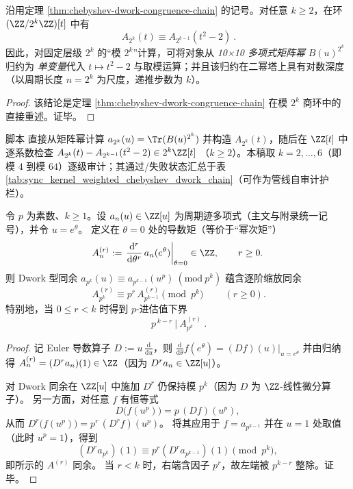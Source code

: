 \begin{corollary}\label{cor:chebyshev-dwork-matrixfree}
沿用定理 \ref{thm:chebyshev-dwork-congruence-chain} 的记号。对任意 \(k\ge 2\)，在环 \((\ZZ/2^k\ZZ)[t]\) 中有
\[
\boxed{\ A_{2^k}(t)\equiv A_{2^{k-1}}(t^2-2)\ }.
\]
因此，对固定层级 \(2^k\) 的“模 \(2^k\)”计算，可将对象从 \emph{10×10 多项式矩阵幂} \(B(u)^{2^k}\) 归约为 \emph{单变量}代入 \(t\mapsto t^2-2\) 与取模运算；并且该归约在二幂塔上具有对数深度（以周期长度 \(n=2^k\) 为尺度，递推步数为 \(k\)）。
\end{corollary}
\begin{proof}
该结论是定理 \ref{thm:chebyshev-dwork-congruence-chain} 在模 \(2^k\) 商环中的直接重述。证毕。
\end{proof}

\begin{remark}\label{rem:chebyshev-dwork-audit}
脚本  直接从矩阵幂计算
\(
a_{2^k}(u)=\Tr(B(u)^{2^k})
\)
并构造 \(A_{2^k}(t)\)，随后在 \(\ZZ[t]\) 中逐系数检查
\(
A_{2^k}(t)-A_{2^{k-1}}(t^2-2)\in 2^k\ZZ[t]
\)
（\(k\ge 2\)）。本稿取 \(k=2,\dots,6\)（即模 \(4\) 到模 \(64\)）逐级审计；其通过/失败状态汇总于表 \ref{tab:sync_kernel_weighted_chebyshev_dwork_chain}（可作为管线自审计护栏）。
\end{remark}


\begin{proposition}\label{prop:witt-theta-derivative-filter}
令 \(p\) 为素数、\(k\ge 1\)。设 \(a_n(u)\in\ZZ[u]\) 为周期迹多项式（主文与附录统一记号），并令 \(u=e^\theta\)。
定义在 \(\theta=0\) 处的导数矩（等价于“幂次矩”）
$$
A_{n}^{(r)}:=\left.\frac{\mathrm{d}^r}{\mathrm{d}\theta^r}\,a_n(e^\theta)\right|_{\theta=0}\in\ZZ,\qquad r\ge 0.
$$
则 Dwork 型同余 \(a_{p^k}(u)\equiv a_{p^{k-1}}(u^p)\ (\mathrm{mod}\ p^k)\) 蕴含逐阶缩放同余
$$
\boxed{\ A_{p^k}^{(r)}\equiv p^r\,A_{p^{k-1}}^{(r)}\pmod{p^k}\ }\qquad(r\ge 0).
$$
特别地，当 \(0\le r<k\) 时得到 \(p\)-进估值下界
$$
\boxed{\ p^{\,k-r}\ \big|\ A_{p^k}^{(r)}\ }.
$$
\end{proposition}
\begin{proof}
记 Euler 导数算子 \(D:=u\,\frac{\mathrm{d}}{\mathrm{d}u}\)，则
\(
\frac{\mathrm{d}}{\mathrm{d}\theta}f(e^\theta)=(Df)(u)\big|_{u=e^\theta}
\)
并由归纳得
\(
A_n^{(r)}=(D^r a_n)(1)\in\ZZ
\)（因为 \(D^r a_n\in\ZZ[u]\)）。
\par
对 Dwork 同余在 \(\ZZ[u]\) 中施加 \(D^r\) 仍保持模 \(p^k\)（因为 \(D\) 为 \(\ZZ\)-线性微分算子）。
另一方面，对任意 \(f\) 有恒等式
$$
D\bigl(f(u^p)\bigr)=p\,(Df)(u^p),
$$
从而 \(D^r\bigl(f(u^p)\bigr)=p^r\,(D^r f)(u^p)\)。
将其应用于 \(f=a_{p^{k-1}}\) 并在 \(u=1\) 处取值（此时 \(u^p=1\)），得到
$$
(D^r a_{p^k})(1)\equiv p^r (D^r a_{p^{k-1}})(1)\pmod{p^k},
$$
即所示的 \(A^{(r)}\) 同余。
当 \(r<k\) 时，右端含因子 \(p^r\)，故左端被 \(p^{k-r}\) 整除。证毕。
\end{proof}

